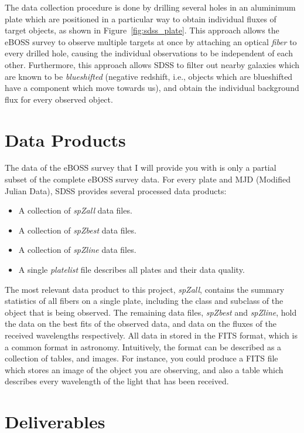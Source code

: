 The data collection procedure is done by drilling several holes in an aluminimum plate which are positioned in a particular way to obtain individual fluxes of target objects, as shown in Figure~\ref{fig:sdss_plate}. This approach allows the eBOSS survey to observe multiple targets at once by attaching an optical \emph{fiber} to every drilled hole, causing the individual observations to be independent of each other. Furthermore, this approach allows SDSS to filter out nearby galaxies which are known to be \emph{blueshifted} (negative redshift, i.e., objects which are blueshifted have a component which move towards us), and obtain the individual background flux for every observed object.

\newpage
\section{Data Products}
\label{sec:data_products}

The data of the eBOSS survey that I will provide you with is only a partial subset of the complete eBOSS survey data. For every plate and MJD (Modified Julian Data), SDSS provides several processed data products:

\begin{itemize}
  \item A collection of \emph{spZall} data files.
  \item A collection of \emph{spZbest} data files.
  \item A collection of \emph{spZline} data files.
  \item A single \emph{platelist} file describes all plates and their data quality.
\end{itemize}

The most relevant data product to this project, \emph{spZall}, contains the summary statistics of all fibers on a single plate, including the class and subclass of the object that is being observed. The remaining data files, \emph{spZbest} and \emph{spZline}, hold the data on the best fits of the observed data, and data on the fluxes of the received wavelengths respectively. All data in stored in the FITS format, which is a common format in astronomy. Intuitively, the format can be described as a collection of tables, and images. For instance, you could produce a FITS file which stores an image of the object you are observing, and also a table which describes every wavelength of the light that has been received.

\section{Deliverables}
\label{sec:deliverables}

